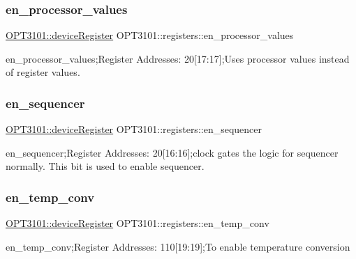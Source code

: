 \subsubsection{\texorpdfstring{en\+\_\+processor\+\_\+values}{en\_processor\_values}}
{\footnotesize\ttfamily \mbox{\hyperlink{class_o_p_t3101_1_1device_register}{O\+P\+T3101\+::device\+Register}} O\+P\+T3101\+::registers\+::en\+\_\+processor\+\_\+values}



en\+\_\+processor\+\_\+values;Register Addresses\+: 20\mbox{[}17\+:17\mbox{]};Uses processor values instead of register values. 

\mbox{\label{class_o_p_t3101_1_1registers_a5aa127e2bb97659c3f7771f2caa204aa}} 
\subsubsection{\texorpdfstring{en\+\_\+sequencer}{en\_sequencer}}
{\footnotesize\ttfamily \mbox{\hyperlink{class_o_p_t3101_1_1device_register}{O\+P\+T3101\+::device\+Register}} O\+P\+T3101\+::registers\+::en\+\_\+sequencer}



en\+\_\+sequencer;Register Addresses\+: 20\mbox{[}16\+:16\mbox{]};clock gates the logic for sequencer normally. This bit is used to enable sequencer. 

\mbox{\label{class_o_p_t3101_1_1registers_ad173e07a43ed5567cae02a49dd9ffdeb}} 
\subsubsection{\texorpdfstring{en\+\_\+temp\+\_\+conv}{en\_temp\_conv}}
{\footnotesize\ttfamily \mbox{\hyperlink{class_o_p_t3101_1_1device_register}{O\+P\+T3101\+::device\+Register}} O\+P\+T3101\+::registers\+::en\+\_\+temp\+\_\+conv}



en\+\_\+temp\+\_\+conv;Register Addresses\+: 110\mbox{[}19\+:19\mbox{]};To enable temperature conversion 

